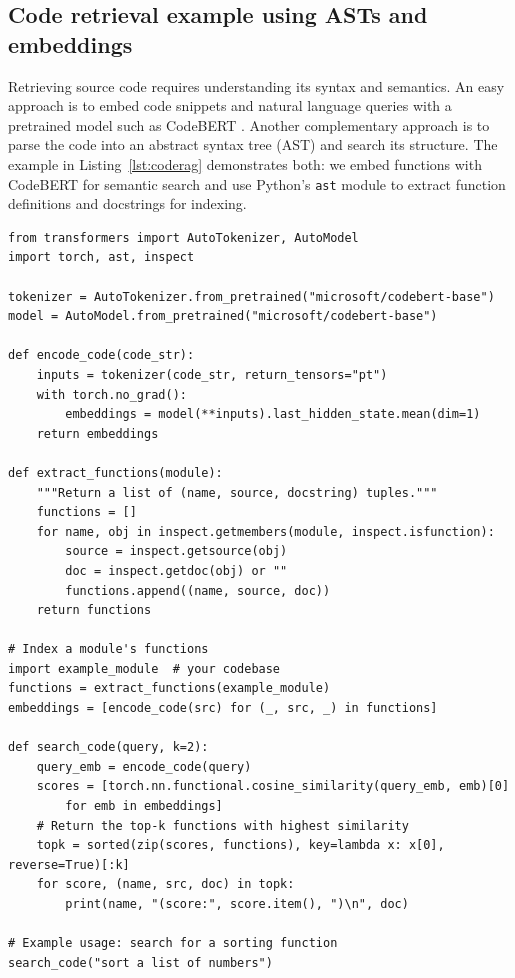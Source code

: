 \subsection{Code retrieval example using ASTs and embeddings}

Retrieving source code requires understanding its syntax and semantics.  An easy approach is to embed code snippets and natural language queries with a pretrained model such as CodeBERT \citep{feng2020codebert}.  Another complementary approach is to parse the code into an abstract syntax tree (AST) and search its structure.  The example in Listing~\ref{lst:coderag} demonstrates both: we embed functions with CodeBERT for semantic search and use Python's \texttt{ast} module to extract function definitions and docstrings for indexing.


\begin{listing}[!ht]
\begin{verbatim}
from transformers import AutoTokenizer, AutoModel
import torch, ast, inspect

tokenizer = AutoTokenizer.from_pretrained("microsoft/codebert-base")
model = AutoModel.from_pretrained("microsoft/codebert-base")

def encode_code(code_str):
    inputs = tokenizer(code_str, return_tensors="pt")
    with torch.no_grad():
        embeddings = model(**inputs).last_hidden_state.mean(dim=1)
    return embeddings

def extract_functions(module):
    """Return a list of (name, source, docstring) tuples."""
    functions = []
    for name, obj in inspect.getmembers(module, inspect.isfunction):
        source = inspect.getsource(obj)
        doc = inspect.getdoc(obj) or ""
        functions.append((name, source, doc))
    return functions

# Index a module's functions
import example_module  # your codebase
functions = extract_functions(example_module)
embeddings = [encode_code(src) for (_, src, _) in functions]

def search_code(query, k=2):
    query_emb = encode_code(query)
    scores = [torch.nn.functional.cosine_similarity(query_emb, emb)[0] 
        for emb in embeddings]
    # Return the top-k functions with highest similarity
    topk = sorted(zip(scores, functions), key=lambda x: x[0], reverse=True)[:k]
    for score, (name, src, doc) in topk:
        print(name, "(score:", score.item(), ")\n", doc)

# Example usage: search for a sorting function
search_code("sort a list of numbers")
\end{verbatim}
\caption{An Example of Code-based Retrieval in Python}
\label{lst:coderag}
\end{listing}

